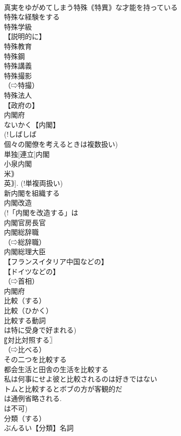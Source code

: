 \documentclass[8pt]{extreport}
\begin{document}
\begin{CJK}{UTF8}{min}
\\	真実をゆがめてしまう特殊｟特異｠な才能を持っている
\\	特殊な経験をする
\\	特殊学級
\\	【説明的に】
\\	特殊教育
\\	特殊鋼
\\	特殊講義
\\	特殊撮影
\\	（⇨特撮）
\\	特殊法人
\\	【政府の】
\\	内閣府		
\\	ないかく【内閣】
\\	(!しばしば 
\\	個々の閣僚を考えるときは複数扱い)
\\	単独[連立]内閣
\\	小泉内閣
\\	米｠ 
\\	英｠]. (!単複両扱い)
\\	新内閣を組織する
\\	内閣改造
\\	(!「内閣を改造する」は 
\\	内閣官房長官
\\	内閣総辞職
\\	（⇨総辞職）
\\	内閣総理大臣
\\	【フランスイタリア中国などの】
\\	【ドイツなどの】
\\	（⇨首相）
\\	内閣府
\\	比較（する）		
\\	比較（ひかく）
\\	比較する動詞
\\	は特に受身で好まれる) 
\\	〖対比対照する〗
\\	（⇨比べる）
\\	その二つを比較する
\\	都会生活と田舎の生活を比較する
\\	私は何事にせよ彼と比較されるのは好きではない
\\	トムと比較するとボブの方が客観的だ
\\	は通例省略される. 
\\	は不可) 
\\	分類（する）		
\\	ぶんるい【分類】名詞

\end{CJK}
\end{document}
